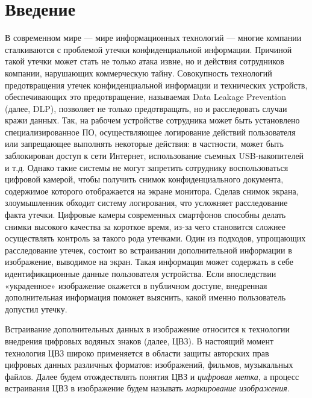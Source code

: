 \documentclass[12pt,a4paper]{article}
\begin{document}
\newpage
\begin{abstract}
	{}
	

\end{abstract}

\newpage
\tableofcontents



\newpage
\section{Введение}
В современном мире — мире информационных технологий — многие компании сталкиваются с проблемой утечки конфиденциальной информации.
Причиной такой утечки может стать не только атака извне, но и действия сотрудников компании, нарушающих коммерческую тайну.
Совокупность технологий предотвращения утечек конфиденциальной информации и технических устройств, обеспечивающих это предотвращение, называемая Data Leakage Prevention (далее, DLP), позволяет не только предотвращать, но и расследовать случаи кражи данных.
Так, на рабочем устройстве сотрудника может быть установлено специализированное ПО, осуществляющее логирование действий пользователя или запрещающее выполнять некоторые действия: в частности, может быть заблокирован доступ к сети Интернет, использование съемных USB-накопителей и т.д.
Однако такие системы не могут запретить сотруднику воспользоваться цифровой камерой, чтобы получить снимок конфиденциального документа, содержимое которого отображается на экране монитора.
Сделав снимок экрана, злоумышленник обходит систему логирования, что усложняет расследование факта утечки. 
Цифровые камеры современных смартфонов способны делать снимки высокого качества за короткое время, из-за чего становится сложнее осуществлять контроль за такого рода утечками.
Один из подходов, упрощающих расследование утечек, состоит во встраивании дополнительной информации в изображение, выводимое на экран.
Такая информация может содержать в себе идентификационные данные пользователя устройства.
Если впоследствии «украденное» изображение окажется в публичном доступе, внедренная дополнительная информация поможет выяснить, какой именно пользователь допустил утечку.

Встраивание дополнительных данных в изображение относится к технологии внедрения цифровых водяных знаков (далее, ЦВЗ).
В настоящий момент технология ЦВЗ широко применяется в области защиты авторских прав цифровых данных различных форматов: изображений, фильмов, музыкальных файлов.
Далее будем отождествлять понятия ЦВЗ и \textit{цифровая метка}, а процесс встраивания ЦВЗ в изображение будем называть \textit{маркирование изображения}.
\end{document}
